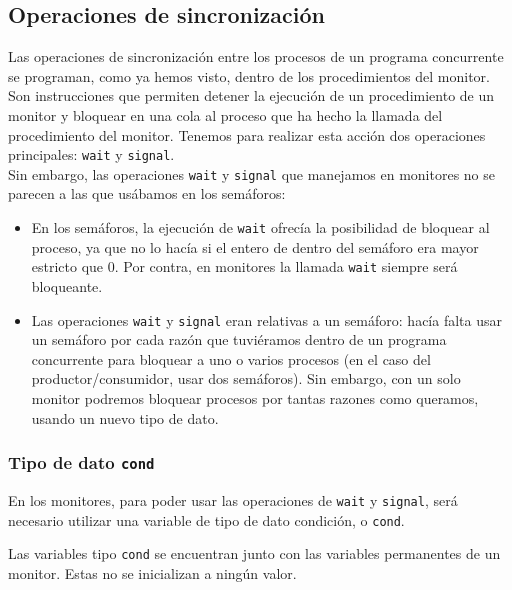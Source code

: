 \subsection{Operaciones de sincronización}
Las operaciones de sincronización entre los procesos de un programa concurrente se programan, como ya hemos visto, dentro de los procedimientos del monitor. Son instrucciones que permiten detener la ejecución de un procedimiento de un monitor y bloquear en una cola al proceso que ha hecho la llamada del procedimiento del monitor. Tenemos para realizar esta acción dos operaciones principales: \verb|wait| y \verb|signal|.\\

Sin embargo, las operaciones \verb|wait| y \verb|signal| que manejamos en monitores no se parecen a las que usábamos en los semáforos:
\begin{itemize}
    \item En los semáforos, la ejecución de \verb|wait| ofrecía la posibilidad de bloquear al proceso, ya que no lo hacía si el entero de dentro del semáforo era mayor estricto que $0$. Por contra, en monitores la llamada \verb|wait| siempre será bloqueante.
    \item Las operaciones \verb|wait| y \verb|signal| eran relativas a un semáforo: hacía falta usar un semáforo por cada razón que tuviéramos dentro de un programa concurrente para bloquear a uno o varios procesos (en el caso del productor/consumidor, usar dos semáforos). Sin embargo, con un solo monitor podremos bloquear procesos por tantas razones como queramos, usando un nuevo tipo de dato.
\end{itemize}

\subsubsection{Tipo de dato \texttt{cond}}
En los monitores, para poder usar las operaciones de \verb|wait| y \verb|signal|, será necesario utilizar una variable de tipo de dato condición, o \verb|cond|. 

Las variables tipo \verb|cond| se encuentran junto con las variables permanentes de un monitor. Estas no se inicializan a ningún valor.\\

